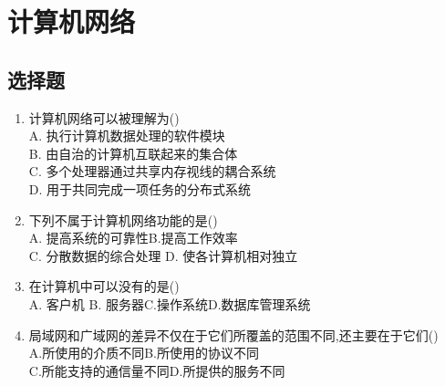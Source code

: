 \documentclass[12pt, a4paper, oneside, UTF8]{ctexbook}
\begin{document}
% 
\else
\fi
\chapter{计算机网络}
\section{选择题}
\begin{enumerate}
    \item 计算机网络可以被理解为() \\
    A. 执行计算机数据处理的软件模块 \\
    B. 由自治的计算机互联起来的集合体 \\
    C. 多个处理器通过共享内存视线的耦合系统 \\
    D. 用于共同完成一项任务的分布式系统 
    \item 下列不属于计算机网络功能的是() \\
    A. 提高系统的可靠性\qquad B.提高工作效率 \\
    C. 分散数据的综合处理 \qquad D. 使各计算机相对独立 
    

    \item 在计算机中可以没有的是() \\
    A. 客户机 \qquad B. 服务器\qquad C.操作系统\qquad D.数据库管理系统 


    \item 局域网和广域网的差异不仅在于它们所覆盖的范围不同,还主要在于它们() \\
    A.所使用的介质不同\qquad B.所使用的协议不同 \\
    C.所能支持的通信量不同\qquad D.所提供的服务不同


\end{enumerate}
\end{document}
